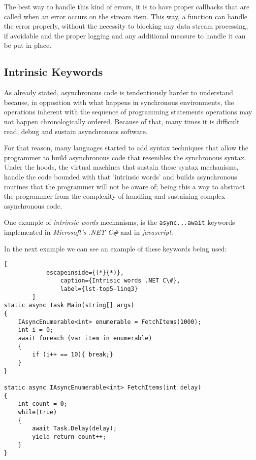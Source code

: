 	The best way to handle this kind of errors, it is to have proper callbacks that are called when an error occurs on the stream item. This way, a function can handle the error properly, without the necessity to blocking any data stream processing, if avoidable and the proper logging and any additional measure to handle it can be put in place.
	\clearpage
	

	\subsection{Intrinsic Keywords} 
	
	As already stated, asynchronous code is tendentiously harder to understand because, in opposition with what happens in synchronous environments, the operations inherent with the sequence of programming statements operations may not happen chronologically ordered. 
	Because of that, many times it is difficult read, debug and sustain asynchronous software. 

	For that reason, many languages started to add syntax techniques that allow the programmer to build asynchronous code that resembles the synchronous syntax.
	Under the hoods, the virtual machines that sustain these syntax mechanisms, handle the code bounded with that 'intrinsic words' and builds asynchronous routines that the programmer will not be aware of;
	being this a way to abstract the programmer from the complexity of handling and sustaining complex asynchronous code. 

	One example of \textit{intrinsic words} mechanisms, is the \texttt{async...await} keywords implemented in \textit{Microsoft's .NET C\#} and in \textit{javascript}. 
	
	In the next example we can see an example of these keywords being used:

	\begin{center}
		\lstset{basicstyle=\scriptsize\ttfamily,frame=bottomline}
		\begin{lstlisting}[
			escapeinside={(*}{*)},
				caption={Intrisic words .NET C\#},
				label={lst-top5-linq3}
		]
static async Task Main(string[] args)
{
	IAsyncEnumerable<int> enumerable = FetchItems(1000);
	int i = 0;
	await foreach (var item in enumerable)
	{
		if (i++ == 10){ break;}
	}
}

static async IAsyncEnumerable<int> FetchItems(int delay)
{
	int count = 0;
	while(true)
	{
		await Task.Delay(delay);
		yield return count++;
	}
}
		\end{lstlisting}
	\end{center}


